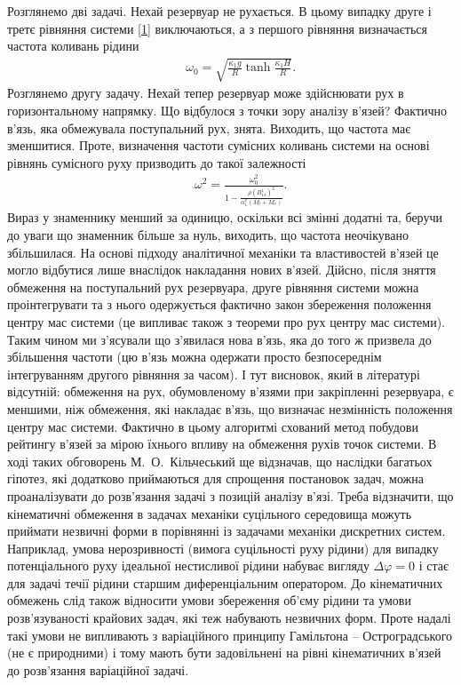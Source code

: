 \documentclass[11pt, reqno]{amsart}
\begin{document}
Розглянемо дві задачі. Нехай резервуар не рухається. В цьому випадку друге і третє рівняння системи \eqref{1} виключаються, а з першого рівняння визначається частота коливань рідини
\begin{eqnarray*}
   &&\omega_0 =\sqrt{\frac {\kappa_1 g}{R} \tanh \frac{\kappa_1 H}{R}}.
\end{eqnarray*}
Розглянемо другу задачу. Нехай тепер резервуар може здійснювати рух в горизонтальному напрямку. Що відбулося з точки зору аналізу в'язей? Фактично в'язь, яка обмежувала поступальний рух, знята. Виходить, що частота має зменшитися. Проте, визначення частоти сумісних коливань системи на основі рівнянь сумісного руху призводить до такої залежності
\begin{eqnarray*}
   &&\omega^2=\frac{\omega_0^2}{1- \displaystyle \frac{\rho (B_{1x}^1)^2}{\alpha_1^x (M_l+M_r)}}.
\end{eqnarray*}
Вираз у знаменнику менший за одиницю, оскільки всі змінні додатні та, беручи до уваги що знаменник більше за нуль, виходить, що частота неочікувано збільшилася. На основі підходу аналітичної механіки та властивостей в’язей це могло відбутися лише внаслідок накладання нових в’язей. Дійсно, після зняття обмеження на поступальний рух резервуара, друге рівняння системи можна проінтегрувати та з нього одержується фактично закон збереження положення центру мас системи (це випливає також з теореми про рух центру мас системи). Таким чином ми з'ясували що з'явилася нова в'язь, яка до того ж призвела до збільшення частоти (цю в'язь можна одержати просто безпосереднім інтегруванням другого рівняння за часом). І тут висновок, який в літературі відсутній: обмеження на рух, обумовленому в'язями при закріпленні резервуара, є меншими, ніж обмеження, які накладає в'язь, що визначає незмінність положення центру мас системи. Фактично в цьому алгоритмі схований метод побудови рейтингу в’язей за мірою їхнього впливу на обмеження рухів точок системи. В ході таких обговорень М.~О.~Кільчеський ще відзначав, що наслідки багатьох гіпотез, які додатково приймаються для спрощення постановок задач, можна проаналізувати до розв'язання задачі з позицій аналізу в'язі. Треба відзначити, що кінематичні обмеження в задачах механіки суцільного середовища можуть приймати незвичні форми в порівнянні із задачами механіки дискретних систем. Наприклад, умова нерозривності (вимога суцільності руху рідини) для випадку потенціального руху ідеальної нестисливої рідини набуває вигляду $\Delta \varphi =0$ і стає для задачі течії рідини старшим диференціальним оператором. До кінематичних обмежень слід також відносити умови збереження об'єму рідини та умови розв'язуваності крайових задач, які теж набувають незвичних форм. Проте надалі такі умови не випливають з варіаційного принципу Гамільтона -- Остроградського (не є природними) і тому мають бути задовільнені на рівні кінематичних в’язей до розв'язання варіаційної задачі.
\end{document}
